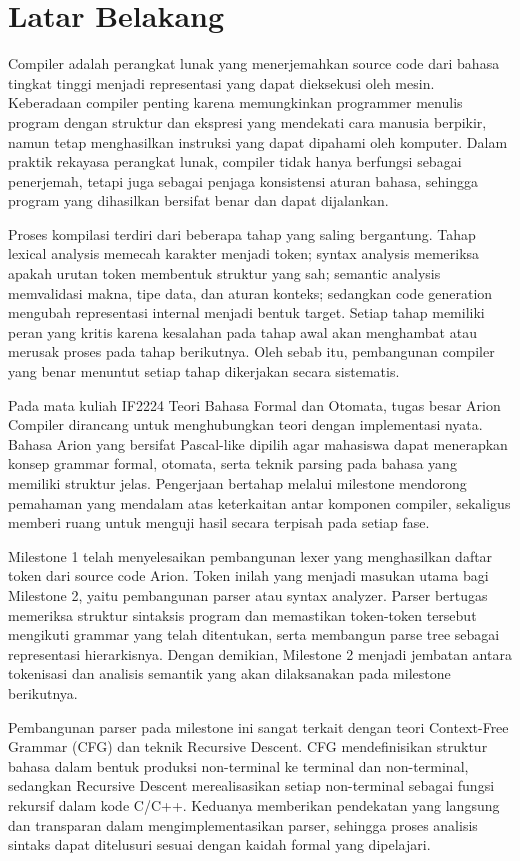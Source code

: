 \section{Latar Belakang}
Compiler adalah perangkat lunak yang menerjemahkan source code dari bahasa 
tingkat tinggi menjadi representasi yang dapat dieksekusi oleh mesin. Keberadaan 
compiler penting karena memungkinkan programmer menulis program dengan struktur dan 
ekspresi yang mendekati cara manusia berpikir, namun tetap menghasilkan instruksi 
yang dapat dipahami oleh komputer. Dalam praktik rekayasa perangkat lunak, compiler 
tidak hanya berfungsi sebagai penerjemah, tetapi juga sebagai penjaga konsistensi 
aturan bahasa, sehingga program yang dihasilkan bersifat benar dan dapat dijalankan.

Proses kompilasi terdiri dari beberapa tahap yang saling bergantung. Tahap lexical 
analysis memecah karakter menjadi token; syntax analysis memeriksa apakah urutan 
token membentuk struktur yang sah; semantic analysis memvalidasi makna, tipe data, 
dan aturan konteks; sedangkan code generation mengubah representasi internal menjadi 
bentuk target. Setiap tahap memiliki peran yang kritis karena kesalahan pada tahap 
awal akan menghambat atau merusak proses pada tahap berikutnya. Oleh sebab itu, 
pembangunan compiler yang benar menuntut setiap tahap dikerjakan secara sistematis.

Pada mata kuliah IF2224 Teori Bahasa Formal dan Otomata, tugas besar Arion Compiler 
dirancang untuk menghubungkan teori dengan implementasi nyata. Bahasa Arion yang 
bersifat Pascal-like dipilih agar mahasiswa dapat menerapkan konsep grammar formal, 
otomata, serta teknik parsing pada bahasa yang memiliki struktur jelas. Pengerjaan 
bertahap melalui milestone mendorong pemahaman yang mendalam atas keterkaitan antar 
komponen compiler, sekaligus memberi ruang untuk menguji hasil secara terpisah pada 
setiap fase.

Milestone 1 telah menyelesaikan pembangunan lexer yang menghasilkan daftar token 
dari source code Arion. Token inilah yang menjadi masukan utama bagi Milestone 2, 
yaitu pembangunan parser atau syntax analyzer. Parser bertugas memeriksa struktur 
sintaksis program dan memastikan token-token tersebut mengikuti grammar yang telah 
ditentukan, serta membangun parse tree sebagai representasi hierarkisnya. Dengan 
demikian, Milestone 2 menjadi jembatan antara tokenisasi dan analisis semantik yang 
akan dilaksanakan pada milestone berikutnya.

Pembangunan parser pada milestone ini sangat terkait dengan teori Context-Free 
Grammar (CFG) dan teknik Recursive Descent. CFG mendefinisikan struktur bahasa dalam 
bentuk produksi non-terminal ke terminal dan non-terminal, sedangkan Recursive Descent 
merealisasikan setiap non-terminal sebagai fungsi rekursif dalam kode C/C++. Keduanya 
memberikan pendekatan yang langsung dan transparan dalam mengimplementasikan parser, 
sehingga proses analisis sintaks dapat ditelusuri sesuai dengan kaidah formal yang dipelajari.

